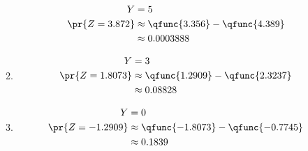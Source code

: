 \documentclass[journal,12pt,twocolumn]{IEEEtran}
\theoremstyle{remark}
\begin{document}
\begin{enumerate}[label=(\roman*)]
\begin{enumerate}
\begin{align}
Y &= 5\\
\pr{Z=3.872} &\approx \qfunc{3.356} - \qfunc{4.389}\\
	     &\approx 0.0003888
\end{align}
\item 
\begin{align}
Y &= 3\\
\pr{Z=1.8073} &\approx \qfunc{1.2909} - \qfunc{2.3237}\\
	      &\approx 0.08828
\end{align}
\item 
\begin{align}
Y &= 0\\
\pr{Z=-1.2909} &\approx \qfunc{-1.8073} - \qfunc{-0.7745}\\
	       &\approx 0.1839
\end{align}
\end{enumerate}
\end{enumerate}
\end{document}
